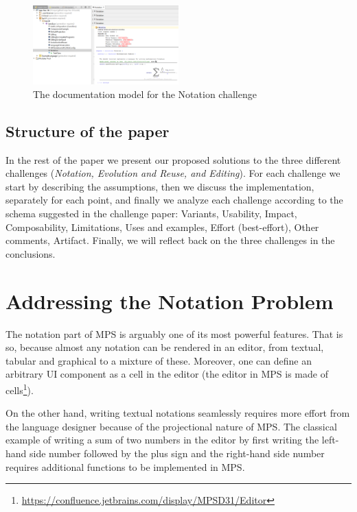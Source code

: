 \documentclass[preprint,numbers,10pt]{sigplanconf}
\begin{document}
\begin{figure}[H]
	\centering
	\includegraphics[width=0.50\textwidth]{screens/OpenNotation.png}
	\caption{The documentation model for the Notation challenge}
	\label{fig:opennotation}
\end{figure}

\subsection{Structure of the paper}

In the rest of the paper we present our proposed solutions to the
three different challenges (\emph{Notation, Evolution and Reuse, and Editing}).
For each challenge we start by describing the assumptions, then we
discuss the implementation, separately for each point, and finally we
analyze each challenge according to the schema suggested in the challenge
paper\cite{erdweg2015evaluating}:
Variants, Usability, Impact, Composability, Limitations, Uses and examples, Effort (best-effort), Other
comments, Artifact.
Finally, we will reflect back on the three challenges in the conclusions.

%
%

\section{Addressing the Notation Problem}
The notation part of MPS is arguably one of its most powerful features.
That is so, because almost any notation can be rendered in an editor, from textual,
tabular and graphical to a mixture of these. Moreover, one can
define an arbitrary UI component as a cell in the editor (the editor in MPS is made
of cells\footnote{\url{https://confluence.jetbrains.com/display/MPSD31/Editor}}).

On the other hand, writing textual notations seamlessly requires more effort
from the language designer because of the projectional nature of MPS.
The classical example of writing a sum of two numbers in the editor by first writing the left-hand side
number followed by the plus sign and the right-hand side number requires additional
functions to be implemented in MPS.
\end{document}
